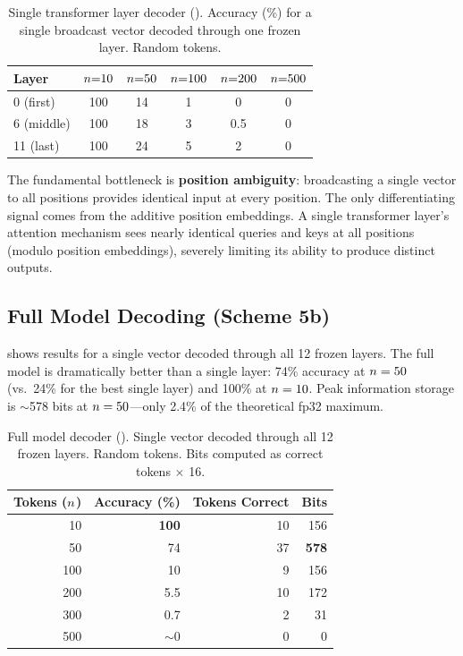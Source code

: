 \begin{table}[t]
    \centering
    \caption{Single transformer layer decoder (\layerdec). Accuracy (\%) for a single broadcast vector decoded through one frozen \gptwo layer. Random tokens.}
    \begin{tabular}{@{}lccccc@{}}
        \toprule
        \textbf{Layer} & $n{=}10$ & $n{=}50$ & $n{=}100$ & $n{=}200$ & $n{=}500$ \\
        \midrule
        0 (first) & 100 & 14 & 1 & 0 & 0 \\
        6 (middle) & 100 & 18 & 3 & 0.5 & 0 \\
        11 (last) & 100 & 24 & 5 & 2 & 0 \\
        \bottomrule
    \end{tabular}
    \label{tab:layer}
\end{table}

The fundamental bottleneck is \textbf{position ambiguity}: broadcasting a single vector to all positions provides identical input at every position. The only differentiating signal comes from the additive position embeddings. A single transformer layer's attention mechanism sees nearly identical queries and keys at all positions (modulo position embeddings), severely limiting its ability to produce distinct outputs.

\subsection{Full Model Decoding (Scheme 5b)}
\label{sec:results_full}

 shows results for a single \memvec vector decoded through all 12 frozen \gptwo layers. The full model is dramatically better than a single layer: 74\% accuracy at $n = 50$ (vs.\ 24\% for the best single layer) and 100\% at $n = 10$. Peak information storage is $\sim$578 bits at $n = 50$---only 2.4\% of the theoretical fp32 maximum.

\begin{table}[t]
    \centering
    \caption{Full model decoder (\fulldec). Single \memvec vector decoded through all 12 frozen \gptwo layers. Random tokens. Bits computed as correct tokens $\times$ 16.}
    \begin{tabular}{@{}rrrr@{}}
        \toprule
        \textbf{Tokens ($n$)} & \textbf{Accuracy (\%)} & \textbf{Tokens Correct} & \textbf{Bits} \\
        \midrule
        10 & \textbf{100} & 10 & 156 \\
        50 & 74 & 37 & \textbf{578} \\
        100 & 10 & 9 & 156 \\
        200 & 5.5 & 10 & 172 \\
        300 & 0.7 & 2 & 31 \\
        500 & $\sim$0 & 0 & 0 \\
        \bottomrule
    \end{tabular}
    \label{tab:full}
\end{table}

